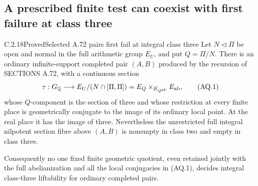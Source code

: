\subsection{A prescribed finite test can coexist with first failure at class three}

\begin{result}{C.2.18}{Proved}{Selected A.72 pairs first fail at integral class three}
\label{thm:ghost-a72-first-class3}
Let \(N\triangleleft\Pi\) be open and normal in the full
arithmetic group \(E_U\), and put \(Q=\Pi/N\).
There is an ordinary infinite-support completed pair
\((A,B)\) produced by the recursion of SECTIONS A.72,
with a continuous section
\[
 \tau:G_{\mathbb Q}\longrightarrow
 E_U/(N\cap[\Pi,\Pi])
   =E_Q\times_{E_{Q^{\rm ab}}}E_{\rm ab},
 \tag{AQ.1}
\]
whose \(Q\)-component is the section of three and whose
restriction at every finite place is geometrically
conjugate to the image of its ordinary local point.
At the real place it has the image of three.
Nevertheless the unrestricted full integral nilpotent
section fibre above \((A,B)\) is nonempty in class two
and empty in class three.

Consequently no one fixed finite geometric quotient,
even retained jointly with the full abelianization and
all the local conjugacies in (AQ.1), decides integral
class-three liftability for ordinary completed pairs.
\end{result}
